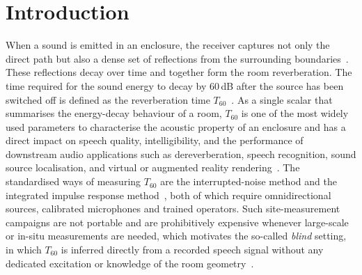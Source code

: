 \documentclass[a4paper,fleqn]{cas-dc}
\begin{document}
\maketitle

\section{Introduction}

When a sound is emitted in an enclosure, the receiver captures not only
the direct path but also a dense set of reflections from the surrounding
boundaries~\citep{kuttruff2013room}. These reflections decay over time and
together form the room reverberation. The time required for the sound
energy to decay by 60\,dB after the source has been switched off is
defined as the reverberation time $T_{60}$~\citep{iso3382_2_2008}. As a
single scalar that summarises the energy-decay behaviour of a room,
$T_{60}$ is one of the most widely used parameters to characterise the
acoustic property of an enclosure and has a direct impact on speech
quality, intelligibility, and the performance of downstream audio
applications such as dereverberation, speech recognition, sound source
localisation, and virtual or augmented reality
rendering~\citep{benzeghiba2007asrreview, anthes2016vr}. The standardised
ways of measuring $T_{60}$ are the interrupted-noise method and the
integrated impulse response method~\citep{schroeder1965rt}, both of which
require omnidirectional sources, calibrated microphones and trained
operators. Such site-measurement campaigns are not portable and are
prohibitively expensive whenever large-scale or in-situ measurements are
needed, which motivates the so-called \emph{blind} setting, in which
$T_{60}$ is inferred directly from a recorded speech signal without any
dedicated excitation or knowledge of the room
geometry~\citep{eaton2016ace}.
\end{document}
